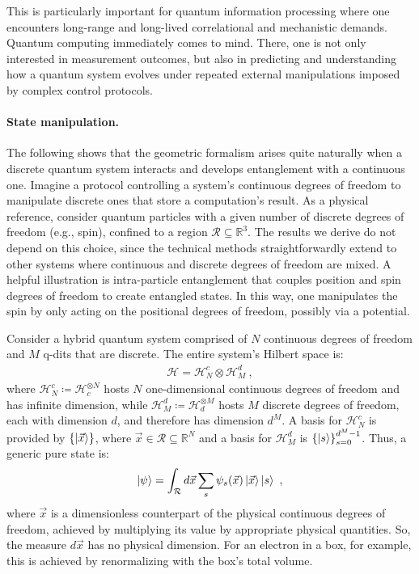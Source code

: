 \documentclass[draft,nofootinbib,pre,twocolumn,showpacs,showkeys,preprintnumbers,floatfix]{revtex4-1}
\newcommand{\1}{\mathbbm{1}}
\begin{document}
This is particularly important for quantum information processing where one
encounters long-range and long-lived correlational and mechanistic demands.
Quantum computing immediately comes to mind. There, one is not only interested
in measurement outcomes, but also in predicting and understanding how a quantum
system evolves under repeated external manipulations imposed by complex control
protocols.


\paragraph*{State manipulation.}
The following shows that the geometric formalism arises quite naturally when a
discrete quantum system interacts and develops entanglement with a continuous
one. Imagine a protocol controlling a system's continuous degrees of freedom to
manipulate discrete ones that store a computation's result. As a physical
reference, consider quantum particles with a given number of discrete degrees
of freedom (e.g., spin), confined to a region $\mathcal{R} \subseteq
\mathbb{R}^3$. The results we derive do not depend on this choice, since the
technical methods straightforwardly extend to other systems where continuous
and discrete degrees of freedom are mixed. A helpful illustration is
intra-particle entanglement \cite{Pasini2020} that couples position and spin
degrees of freedom to create entangled states. In this way, one manipulates the
spin by only acting on the positional degrees of freedom, possibly via a
potential.

Consider a hybrid quantum system comprised of $N$ continuous degrees of freedom
and $M$ q-dits that are discrete. The entire system's Hilbert space is:
\begin{align*}
\mathcal{H} = \mathcal{H}^c_N \otimes \mathcal{H}^d_M
  ~,
\end{align*}
where $\mathcal{H}_N^c \coloneqq \mathcal{H}_c^{\otimes N}$ hosts $N$ one-dimensional continuous degrees of freedom
and has infinite dimension, while $\mathcal{H}^d_M \coloneqq \mathcal{H}_d^{\otimes M}$ hosts 
$M$ discrete degrees of freedom, each with dimension $d$, and therefore has dimension $d^M$. 
A basis for $\mathcal{H}_N^c$ is provided
by $\left\{\ket{\vec{x}}\right\}$, where $\vec{x} \in \mathcal{R} \subseteq
\mathbb{R}^N$ and a basis for $\mathcal{H}_M^d$ is
$\left\{\ket{s}\right\}_{s=0}^{d^M-1}$. Thus, a generic pure state is:
\begin{align*}
\ket{\psi} = \int_{\mathcal{R}} d\vec{x} \sum_{s} \psi_s(\vec{x})\ket{\vec{x}} \ket{s}
  ~,
\end{align*}
where $\vec{x}$ is a dimensionless counterpart of the physical continuous
degrees of freedom, achieved by multiplying its value by appropriate physical
quantities. So, the measure $d\vec{x}$ has no physical dimension. For an
electron in a box, for example, this is achieved by renormalizing with the box's
total volume.
\end{document}
